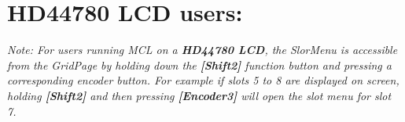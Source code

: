 \section{HD44780 LCD users:}
\textit{Note: For users running MCL on a \textbf{HD44780 LCD}, the SlorMenu  is accessible from the GridPage by holding down the  \textbf{[Shift2]} function button and pressing a corresponding encoder button. For example if slots 5 to 8 are displayed on screen, holding  \textbf{[Shift2]} and then pressing \textbf{[Encoder3]} will open the slot menu for slot 7.}


